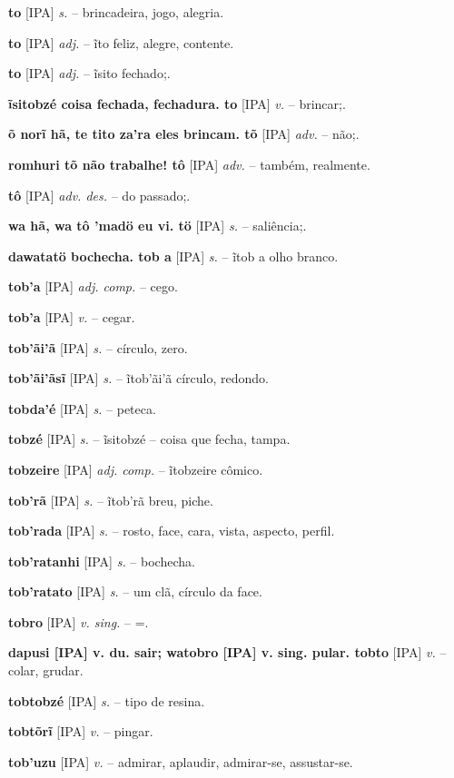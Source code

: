 \textbf{to} [IPA] \textit{s.} -- brincadeira, jogo, alegria.

\textbf{to} [IPA] \textit{adj.} -- ĩto feliz, alegre, contente.

\textbf{to} [IPA] \textit{adj.} -- ĩsito fechado;.

\textbf{ĩsitobzé coisa fechada, fechadura. to} [IPA] \textit{v.} -- brincar;.

\textbf{õ norĩ hã, te tito za'ra eles brincam. tõ} [IPA] \textit{adv.} -- não;.

\textbf{romhuri tõ não trabalhe! tô} [IPA] \textit{adv.} -- também, realmente.

\textbf{tô} [IPA] \textit{adv. des.} -- do passado;.

\textbf{wa hã, wa tô 'madö eu vi. tö} [IPA] \textit{s.} -- saliência;.

\textbf{dawatatö bochecha. tob a} [IPA] \textit{s.} -- ĩtob a olho branco.

\textbf{tob'a} [IPA] \textit{adj. comp.} -- cego.

\textbf{tob'a} [IPA] \textit{v.} -- cegar.

\textbf{tob'ãi'ã} [IPA] \textit{s.} -- círculo, zero.

\textbf{tob'ãi'ãsĩ} [IPA] \textit{s.} -- ĩtob'ãi'ã círculo, redondo.

\textbf{tobda'é} [IPA] \textit{s.} -- peteca.

\textbf{tobzé} [IPA] \textit{s.} -- ĩsitobzé -- coisa que fecha, tampa.

\textbf{tobzeire} [IPA] \textit{adj. comp.} -- ĩtobzeire cômico.

\textbf{tob'rã} [IPA] \textit{s.} -- ĩtob'rã breu, piche.

\textbf{tob'rada} [IPA] \textit{s.} -- rosto, face, cara, vista, aspecto, perfil.

\textbf{tob'ratanhi} [IPA] \textit{s.} -- bochecha.

\textbf{tob'ratato} [IPA] \textit{s.} -- um clã, círculo da face.

\textbf{tobro} [IPA] \textit{v. sing.} -- =.

\textbf{dapusi [IPA] v. du. sair; watobro [IPA] v. sing. pular. tobto} [IPA] \textit{v.} -- colar, grudar.

\textbf{tobtobzé} [IPA] \textit{s.} -- tipo de resina.

\textbf{tobtõrĩ} [IPA] \textit{v.} -- pingar.

\textbf{tob'uzu} [IPA] \textit{v.} -- admirar, aplaudir, admirar-se, assustar-se.

